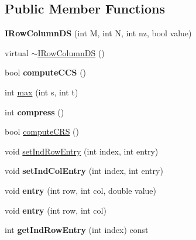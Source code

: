 \subsection*{Public Member Functions}
\begin{DoxyCompactItemize}
\item 
\hypertarget{classIRowColumnDS_adb015e2f5cefbb187fbc150870c0e9c3}{
{\bfseries IRowColumnDS} (int M, int N, int nz, bool value)}
\label{classIRowColumnDS_adb015e2f5cefbb187fbc150870c0e9c3}

\item 
virtual \hyperlink{classIRowColumnDS_a70790b6b45416fde307ac8c7b456e005}{$\sim$IRowColumnDS} ()
\item 
\hypertarget{classIRowColumnDS_ac0d06d0f653f6eb9a2ac3d98a4d779aa}{
bool {\bfseries computeCCS} ()}
\label{classIRowColumnDS_ac0d06d0f653f6eb9a2ac3d98a4d779aa}

\item 
int \hyperlink{classIRowColumnDS_a29f440baacbd3f0cb4729ba9e868f2ae}{max} (int s, int t)
\item 
\hypertarget{classIRowColumnDS_af8420abed5c2b00e615120773a032dd0}{
int {\bfseries compress} ()}
\label{classIRowColumnDS_af8420abed5c2b00e615120773a032dd0}

\item 
bool \hyperlink{classIRowColumnDS_ab93c5ed2748d15f61ac047a033e0deca}{computeCRS} ()
\item 
void \hyperlink{classIRowColumnDS_a83fbd9be18ddd86a224ef172ca7eec6b}{setIndRowEntry} (int index, int entry)
\item 
\hypertarget{classIRowColumnDS_a4a259c7a9069d26fa51361d86cd66de5}{
void {\bfseries setIndColEntry} (int index, int entry)}
\label{classIRowColumnDS_a4a259c7a9069d26fa51361d86cd66de5}

\item 
\hypertarget{classIRowColumnDS_a90f101574c00ebb576b47e39b2ec42d7}{
void {\bfseries entry} (int row, int col, double value)}
\label{classIRowColumnDS_a90f101574c00ebb576b47e39b2ec42d7}

\item 
\hypertarget{classIRowColumnDS_a1f5253e46796967261bb4c70398351bb}{
void {\bfseries entry} (int row, int col)}
\label{classIRowColumnDS_a1f5253e46796967261bb4c70398351bb}

\item 
\hypertarget{classIRowColumnDS_aab9bc21c6d8fe6ae0ddc3d5cbdbf800c}{
int {\bfseries getIndRowEntry} (int index) const }
\label{classIRowColumnDS_aab9bc21c6d8fe6ae0ddc3d5cbdbf800c}


\end{DoxyCompactItemize}
